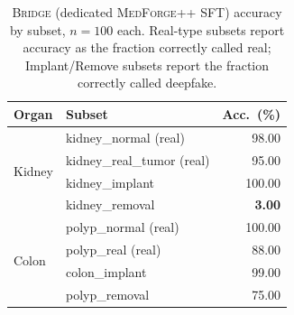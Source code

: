 \documentclass[10pt,twocolumn,letterpaper]{article}
\newcommand{\bridge}{\textsc{Bridge}}
\newcommand{\medforgepp}{\textsc{MedForge++}}
\begin{document}
\begin{table}[h]
\centering
\small
\caption{\bridge{} (dedicated \medforgepp{} SFT) accuracy by subset, $n{=}100$ each. Real-type subsets report accuracy as the fraction correctly called real; Implant/Remove subsets report the fraction correctly called deepfake.}
\label{tab:pfp-subsets-results}
\begin{tabular}{llr}
\toprule
Organ & Subset & Acc.\ (\%) \\
\midrule
\multirow{4}{*}{Kidney} & kidney\_normal (real) & 98.00 \\
 & kidney\_real\_tumor (real) & 95.00 \\
 & kidney\_implant & 100.00 \\
 & kidney\_removal & \textbf{3.00} \\
\midrule
\multirow{4}{*}{Colon} & polyp\_normal (real) & 100.00 \\
 & polyp\_real (real) & 88.00 \\
 & colon\_implant & 99.00 \\
 & polyp\_removal & 75.00 \\
\bottomrule
\end{tabular}
\end{table}
\end{document}
